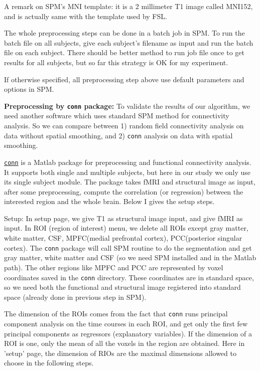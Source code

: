 \documentclass[12pt]{article}
\begin{document}
A remark on SPM's MNI template: it is a 2 millimeter T1 image called MNI152, and is actually same with the template used by FSL.

The whole preprocessing steps can be done in a batch job in SPM. To run the batch file on all subjects, give each subject's filename as input and run the batch file on each subject. There should be better method to run job file once to get results for all subjects, but so far this strategy is OK for my experiment.

If otherwise specified, all preprocessing step above use default parameters and options in SPM.

\textbf{Preprocessing by \texttt{conn} package: } To validate the results of our algorithm, we need another software which uses standard SPM method for connectivity analysis. So we can compare between 1) random field connectivity analysis on data without spatial smoothing, and 2) \texttt{conn} analysis on data with spatial smoothing. 

\href{http://www.nitrc.org/projects/conn/}{\texttt{conn}} is a Matlab package for preprocessing and functional connectivity analysis. It supports both single and multiple subjects, but here in our study we only use its single subject module. The package takes fMRI and structural image as input, after some preprocessing, compute the correlation (or regression) between the interested region and the whole brain. Below I gives the setup steps.

Setup: In setup page, we give T1 as structural image input, and give fMRI as input. In ROI (region of interest) menu, we delete all ROIs except gray matter, white matter, CSF, MPFC(medial prefrontal cortex), PCC(posterior singular cortex). The \texttt{conn} package will call SPM routine to do the segmentation and get gray matter, white matter and CSF (so we need SPM installed and in the Matlab path). The other regions like MPFC and PCC are represented by voxel coordinates saved in the \texttt{conn} directory. These coordinates are in standard space, so we need both the functional and structural image registered into standard space (already done in previous step in SPM). 

The dimension of the ROIs comes from the fact that \texttt{conn} runs principal component analysis on the time courses in each ROI, and get only the first few principal components as regressors (explanatory variables). If the dimension of a ROI is one, only the mean of all the voxels in the region are obtained. Here in 'setup' page, the dimension of RIOs are the maximal dimensions allowed to choose in the following steps.
\end{document}
